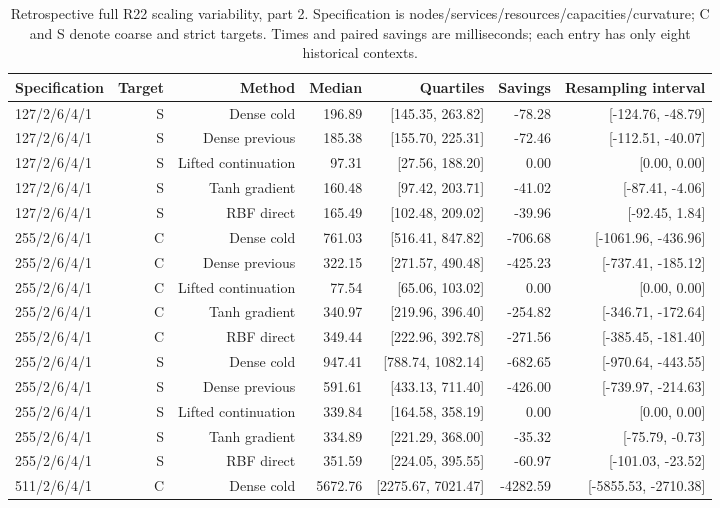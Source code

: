 \begin{table}[tbp]\centering\scriptsize
\caption{Retrospective full R22 scaling variability, part 2. Specification is nodes/services/resources/capacities/curvature; C and S denote coarse and strict targets. Times and paired savings are milliseconds; each entry has only eight historical contexts.}
\label{tab:r24-old-scaling-2}
\begin{tabular}{lrrrrrr}
\toprule
Specification & Target & Method & Median & Quartiles & Savings & Resampling interval\\
\midrule
127/2/6/4/1 & S & Dense cold & 196.89 & [145.35, 263.82] & -78.28 & [-124.76, -48.79]\\
127/2/6/4/1 & S & Dense previous & 185.38 & [155.70, 225.31] & -72.46 & [-112.51, -40.07]\\
127/2/6/4/1 & S & Lifted continuation & 97.31 & [27.56, 188.20] & 0.00 & [0.00, 0.00]\\
127/2/6/4/1 & S & Tanh gradient & 160.48 & [97.42, 203.71] & -41.02 & [-87.41, -4.06]\\
127/2/6/4/1 & S & RBF direct & 165.49 & [102.48, 209.02] & -39.96 & [-92.45, 1.84]\\
255/2/6/4/1 & C & Dense cold & 761.03 & [516.41, 847.82] & -706.68 & [-1061.96, -436.96]\\
255/2/6/4/1 & C & Dense previous & 322.15 & [271.57, 490.48] & -425.23 & [-737.41, -185.12]\\
255/2/6/4/1 & C & Lifted continuation & 77.54 & [65.06, 103.02] & 0.00 & [0.00, 0.00]\\
255/2/6/4/1 & C & Tanh gradient & 340.97 & [219.96, 396.40] & -254.82 & [-346.71, -172.64]\\
255/2/6/4/1 & C & RBF direct & 349.44 & [222.96, 392.78] & -271.56 & [-385.45, -181.40]\\
255/2/6/4/1 & S & Dense cold & 947.41 & [788.74, 1082.14] & -682.65 & [-970.64, -443.55]\\
255/2/6/4/1 & S & Dense previous & 591.61 & [433.13, 711.40] & -426.00 & [-739.97, -214.63]\\
255/2/6/4/1 & S & Lifted continuation & 339.84 & [164.58, 358.19] & 0.00 & [0.00, 0.00]\\
255/2/6/4/1 & S & Tanh gradient & 334.89 & [221.29, 368.00] & -35.32 & [-75.79, -0.73]\\
255/2/6/4/1 & S & RBF direct & 351.59 & [224.05, 395.55] & -60.97 & [-101.03, -23.52]\\
511/2/6/4/1 & C & Dense cold & 5672.76 & [2275.67, 7021.47] & -4282.59 & [-5855.53, -2710.38]\\

\end{tabular}
\end{table}
